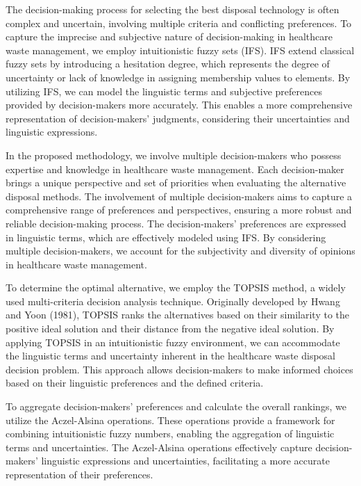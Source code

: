\vspace{5mm}

 The decision-making process for selecting the best disposal technology is often complex and uncertain, involving multiple criteria and conflicting preferences. To capture the imprecise and subjective nature of decision-making in healthcare waste management, we employ intuitionistic fuzzy sets (IFS). IFS extend classical fuzzy sets by introducing a hesitation degree, which represents the degree of uncertainty or lack of knowledge in assigning membership values to elements. By utilizing IFS, we can model the linguistic terms and subjective preferences provided by decision-makers more accurately. This enables a more comprehensive representation of decision-makers' judgments, considering their uncertainties and linguistic expressions.

\vspace{5mm}

In the proposed methodology, we involve multiple decision-makers who possess expertise and knowledge in healthcare waste management. Each decision-maker brings a unique perspective and set of priorities when evaluating the alternative disposal methods. The involvement of multiple decision-makers aims to capture a comprehensive range of preferences and perspectives, ensuring a more robust and reliable decision-making process. The decision-makers' preferences are expressed in linguistic terms, which are effectively modeled using IFS. By considering multiple decision-makers, we account for the subjectivity and diversity of opinions in healthcare waste management.

\vspace{5mm}

To determine the optimal alternative, we employ the TOPSIS method, a widely used multi-criteria decision analysis technique. Originally developed by Hwang and Yoon (1981)\cite{5}, TOPSIS ranks the alternatives based on their similarity to the positive ideal solution and their distance from the negative ideal solution. By applying TOPSIS in an intuitionistic fuzzy environment, we can accommodate the linguistic terms and uncertainty inherent in the healthcare waste disposal decision problem. This approach allows decision-makers to make informed choices based on their linguistic preferences and the defined criteria.

\vspace{5mm}

To aggregate decision-makers' preferences and calculate the overall rankings, we utilize the Aczel-Alsina operations. These operations provide a framework for combining intuitionistic fuzzy numbers, enabling the aggregation of linguistic terms and uncertainties. The Aczel-Alsina operations effectively capture decision-makers' linguistic expressions and uncertainties, facilitating a more accurate representation of their preferences.

